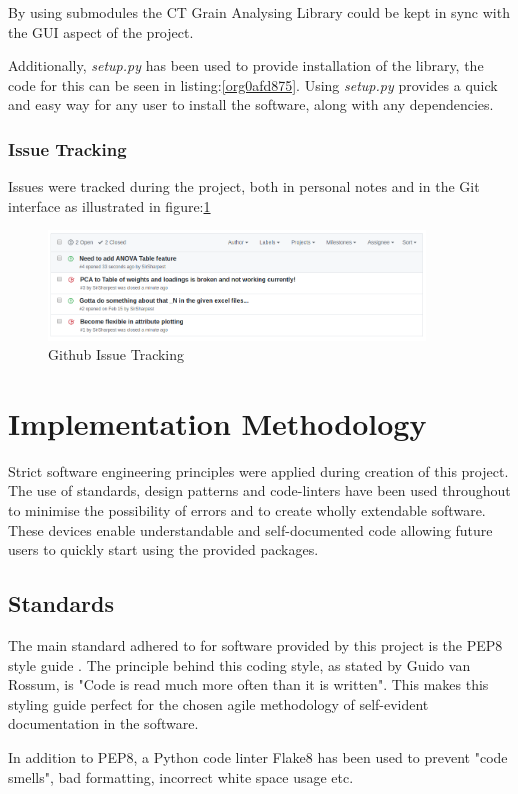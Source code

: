 \documentclass[11pt]{report}
\begin{document}
By using submodules the CT Grain Analysing Library could be kept in sync with the GUI aspect of the project.

Additionally, \emph{setup.py} has been used to provide installation of the library, the code for this can be seen in listing:\ref{org0afd875}. Using \emph{setup.py} provides a quick and easy way for any user to install the software, along with any dependencies.

\subsubsection{Issue Tracking}
\label{sec:org1a2eaaf}
Issues were tracked during the project, both in personal notes and in the Git interface as illustrated in figure:\ref{fig:orgc51f440}
\begin{figure}[htbp]
\centering
\includegraphics[width=10cm]{./images/github.png}
\caption{\label{fig:orgc51f440}
Github Issue Tracking}
\end{figure}

\section{Implementation Methodology}
\label{sec:orge39af49}
Strict software engineering principles were applied during creation of this project. The use of standards, design patterns and code-linters have been used throughout to minimise the possibility of errors and to create wholly extendable software. These devices enable understandable and self-documented code allowing future users to quickly start using the provided packages.
\subsection{Standards}
\label{sec:orgcd5f11f}
The main standard adhered to for software provided by this project is the PEP8 style guide \cite{VanRossum}. The principle behind this coding style, as stated by Guido van Rossum, is "Code is read much more often than it is written". This makes this styling guide perfect for the chosen agile methodology of self-evident documentation in the software.

In addition to PEP8, a Python code linter Flake8 has been used to prevent "code smells", bad formatting, incorrect white space usage etc.
\end{document}
